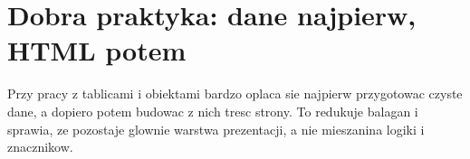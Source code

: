 \section{Dobra praktyka: dane najpierw, HTML potem}
Przy pracy z tablicami i obiektami bardzo oplaca sie najpierw przygotowac czyste dane,
a dopiero potem budowac z nich tresc strony. To redukuje balagan i sprawia, ze 
pozostaje glownie warstwa prezentacji, a nie mieszanina logiki i znacznikow.
